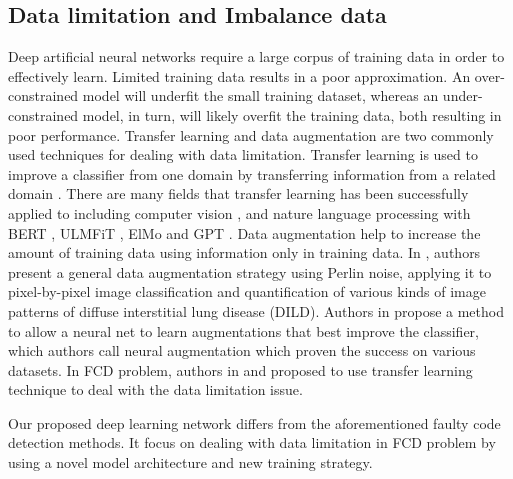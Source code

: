 \subsection{Data limitation and Imbalance data}
Deep artificial neural networks require a large corpus of training data in order to effectively learn. Limited training data results in a poor approximation. An over-constrained model will underfit the small training dataset, whereas an under-constrained model, in turn, will likely overfit the training data, both resulting in poor performance.
Transfer learning and data augmentation are two commonly used techniques for dealing with data limitation. Transfer learning is used to improve a classifier from one domain by transferring information from a related domain \cite{weiss2016survey}. There are many fields that transfer learning has been successfully applied to including computer vision \cite{wang2011heterogeneous}, \cite{zhu2011heterogeneous} and nature language processing with BERT \cite{devlin2018bert}, ULMFiT \cite{howard2018universal}, ElMo \cite{peters2018deep} and GPT \cite{radford2019language}.
Data   augmentation help to increase  the  amount of training data using information only in training data. In \cite{bae2018perlin}, authors present a general data augmentation strategy using Perlin noise, applying it to pixel-by-pixel image classification and quantification of various kinds of image patterns of diffuse interstitial lung disease (DILD). Authors in \cite{perez2017effectiveness} propose a method to allow a neural net to learn augmentations that best improve the classifier, which authors call neural augmentation which proven the success on various datasets.
In FCD problem, authors in \cite{nam2017heterogeneous} and \cite{viet2019transfer} proposed to use transfer learning technique to deal with the data limitation issue.


Our proposed deep learning network differs from the aforementioned faulty code detection methods. It focus on dealing with data limitation in FCD problem by using a novel model architecture and new training strategy.